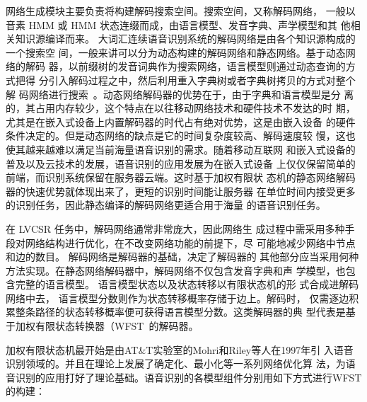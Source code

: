 网络生成模块主要负责将构建解码搜索空间。搜索空间，又称解码网络， 一般以音素 HMM 或 HMM 状态连缀而成，由语言模型、发音字典、声学模型和其
他相关知识源编译而来。
大词汇连续语音识别系统的解码网络是由各个知识源构成的一个搜索空
间，一般来讲可以分为动态构建的解码网络和静态网络。基于动态网络的解码
器，以前缀树的发音词典作为搜索网络，语言模型则通过动态查询的方式把得
分引入解码过程之中，然后利用重入字典树或者字典树拷贝的方式对整个解
码网络进行搜索~\cite{young2002htk}。动态网络解码器的优势在于，由于字典和语言模型是分
离的，其占用内存较少，这个特点在以往移动网络技术和硬件技术不发达的时
期，尤其是在嵌入式设备上内置解码器的时代占有绝对优势，这是由嵌入设备
的硬件条件决定的。但是动态网络的缺点是它的时间复杂度较高、解码速度较
慢，这也使其越来越难以满足当前海量语音识别的需求。随着移动互联网
和嵌入式设备的普及以及云技术的发展，语音识别的应用发展为在嵌入式设备
上仅仅保留简单的前端，而识别系统保留在服务器云端。这时基于加权有限状
态机的静态网络解码器的快速优势就体现出来了，更短的识别时间能让服务器
在单位时间内接受更多的识别任务，因此静态编译的解码网络更适合用于海量
的语音识别任务。

在 LVCSR 任务中，解码网络通常非常庞大，因此网络生
成过程中需采用多种手段对网络结构进行优化，在不改变网络功能的前提下，尽
可能地减少网络中节点和边的数目。 解码网络是解码器的基础，决定了解码器的
其他部分应当采用何种方法实现。在静态网络解码器中，解码网络不仅包含发音字典和声
学模型，也包含完整的语言模型。 语言模型状态以及状态转移以有限状态机的形
式合成进解码网络中去， 语言模型分数则作为状态转移概率存储于边上。解码时，
仅需逐边积累整条路径的状态转移概率便可获得语言模型分数。这类解码器的典
型代表是基于加权有限状态转换器（WFST~\cite{mohri2002weighted}的解码器。

加权有限状态机最开始是由AT\&T实验室的Mohri和Riley等人在1997年引
入语音识别领域的。并且在理论上发展了确定化、最小化等一系列网络优化算
法，为语音识别的应用打好了理论基础。语音识别的各模型组件分别用如下方式进行WFST的构建：

